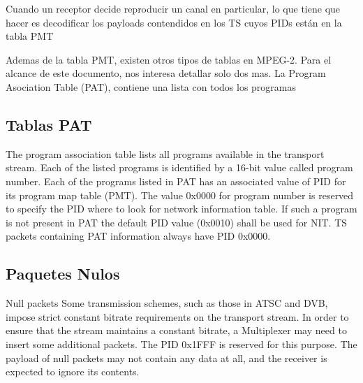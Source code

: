 Cuando un receptor decide reproducir un canal en particular, lo que tiene que hacer es decodificar los payloads contendidos en los TS cuyos PIDs están en la tabla PMT

Ademas de la tabla PMT, existen otros tipos de tablas en MPEG-2. Para el alcance de este documento, nos interesa detallar solo dos mas.
La Program Asociation Table (PAT), contiene una lista con todos los programas 



	
	\subsection{Tablas PAT}
	The program association table lists all programs available in the transport stream. Each of the listed programs is identified by a 16-bit value called program number. Each of the programs listed in PAT has an associated value of PID for its program map table (PMT). 
	The value 0x0000 for program number is reserved to specify the PID where to look for network information table. If such a program is not present in PAT the default PID value (0x0010) shall be used for NIT. 
	TS packets containing PAT information always have PID 0x0000. 
	\subsection{Paquetes Nulos}
	Null packets
	Some transmission schemes, such as those in ATSC and DVB, impose strict constant bitrate requirements on the transport stream. In order to ensure that the stream maintains a constant bitrate, a Multiplexer may need to insert some additional packets. The PID 0x1FFF is reserved for this purpose. The payload of null packets may not contain any data at all, and the receiver is expected to ignore its contents. 


